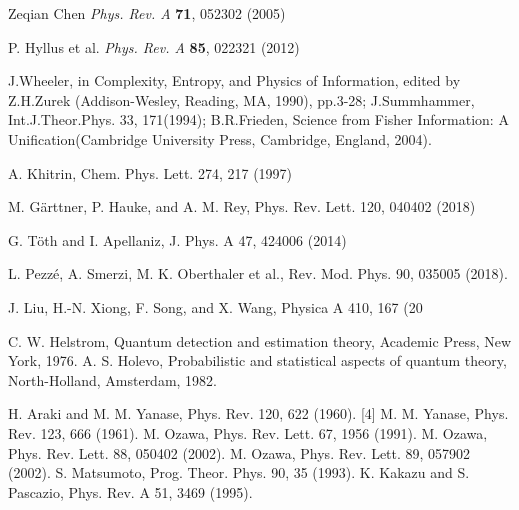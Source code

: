 \begin{thebibliography}{}
 Zeqian Chen \textit{Phys. Rev. A} \textbf{71}, 052302 (2005)

 P. Hyllus et al. \textit{Phys. Rev. A} \textbf{85}, 022321 (2012)


 J.Wheeler, in Complexity, Entropy, and Physics of Information, edited by Z.H.Zurek (Addison-Wesley, Reading, MA, 1990), pp.3-28;
J.Summhammer, Int.J.Theor.Phys. 33, 171(1994);
 B.R.Frieden, Science from Fisher Information: A Unification(Cambridge University Press, Cambridge, England, 2004).

 A. Khitrin, Chem. Phys. Lett. 274, 217 (1997)

 M. G\"arttner, P. Hauke, and A. M. Rey, Phys. Rev. Lett. 120, 040402 (2018)

 G. T\"oth and I. Apellaniz, J. Phys. A 47, 424006 (2014)

 L. Pezz\'e, A. Smerzi, M. K. Oberthaler et al., Rev. Mod. Phys. 90, 035005 (2018).

 J. Liu, H.-N. Xiong, F. Song, and X. Wang, Physica A 410, 167 (20


 C. W. Helstrom, Quantum detection and estimation theory, Academic Press, New York, 1976.
 A. S. Holevo, Probabilistic and statistical aspects of quantum theory, North-Holland, Amsterdam, 1982.



 H. Araki and M. M. Yanase, Phys. Rev. 120, 622 (1960). [4] M. M. Yanase, Phys. Rev. 123, 666 (1961).
 M. Ozawa, Phys. Rev. Lett. 67, 1956 (1991).
 M. Ozawa, Phys. Rev. Lett. 88, 050402 (2002).
 M. Ozawa, Phys. Rev. Lett. 89, 057902 (2002).
 S. Matsumoto, Prog. Theor. Phys. 90, 35 (1993).
 K. Kakazu and S. Pascazio, Phys. Rev. A 51, 3469
(1995).



\end{thebibliography}
